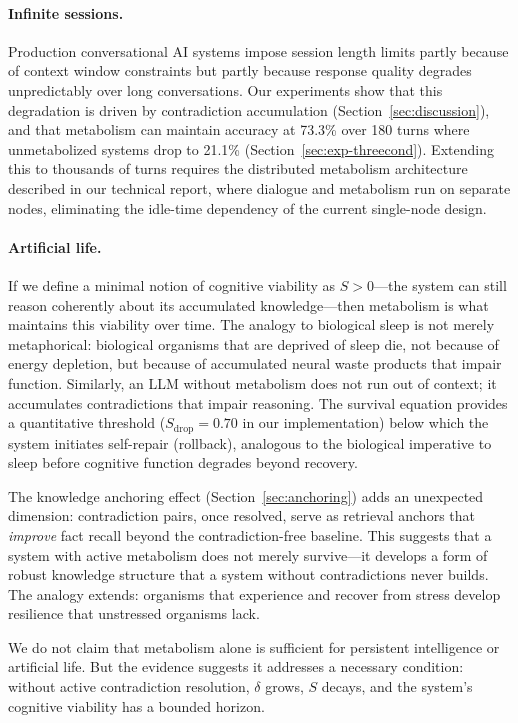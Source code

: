 \documentclass[11pt,a4paper]{article}
\begin{document}
\paragraph{Infinite sessions.}
Production conversational AI systems impose session length limits partly because of context window constraints but partly because response quality degrades unpredictably over long conversations. Our experiments show that this degradation is driven by contradiction accumulation (Section~\ref{sec:discussion}), and that metabolism can maintain accuracy at 73.3\% over 180 turns where unmetabolized systems drop to 21.1\% (Section~\ref{sec:exp-threecond}). Extending this to thousands of turns requires the distributed metabolism architecture described in our technical report, where dialogue and metabolism run on separate nodes, eliminating the idle-time dependency of the current single-node design.

\paragraph{Artificial life.}
If we define a minimal notion of cognitive viability as $S > 0$---the system can still reason coherently about its accumulated knowledge---then metabolism is what maintains this viability over time. The analogy to biological sleep is not merely metaphorical: biological organisms that are deprived of sleep die, not because of energy depletion, but because of accumulated neural waste products that impair function. Similarly, an LLM without metabolism does not run out of context; it accumulates contradictions that impair reasoning. The survival equation provides a quantitative threshold ($S_{\text{drop}} = 0.70$ in our implementation) below which the system initiates self-repair (rollback), analogous to the biological imperative to sleep before cognitive function degrades beyond recovery.

The knowledge anchoring effect (Section~\ref{sec:anchoring}) adds an unexpected dimension: contradiction pairs, once resolved, serve as retrieval anchors that \emph{improve} fact recall beyond the contradiction-free baseline. This suggests that a system with active metabolism does not merely survive---it develops a form of robust knowledge structure that a system without contradictions never builds. The analogy extends: organisms that experience and recover from stress develop resilience that unstressed organisms lack.

We do not claim that metabolism alone is sufficient for persistent intelligence or artificial life. But the evidence suggests it addresses a necessary condition: without active contradiction resolution, $\delta$ grows, $S$ decays, and the system's cognitive viability has a bounded horizon.
\end{document}
